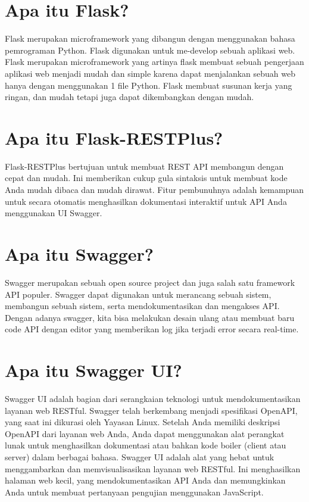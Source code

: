


\section{Apa itu Flask?}
Flask merupakan microframework yang dibangun dengan
menggunakan bahasa pemrograman Python. Flask digunakan
untuk me-develop sebuah aplikasi web. Flask merupakan
microframework yang artinya flask membuat sebuah pengerjaan
aplikasi web menjadi mudah dan simple karena dapat menjalankan
sebuah web hanya dengan menggunakan 1 file Python. Flask
membuat susunan kerja yang ringan, dan mudah tetapi juga dapat
dikembangkan dengan mudah\cite{gunawan2018aplikasi}.

\section{Apa itu Flask-RESTPlus?}
Flask-RESTPlus bertujuan untuk membuat REST API membangun dengan cepat dan mudah. Ini memberikan cukup gula sintaksis untuk membuat kode Anda mudah dibaca dan mudah dirawat. Fitur pembunuhnya adalah kemampuan untuk secara otomatis menghasilkan dokumentasi interaktif untuk API Anda menggunakan UI Swagger.

\section{Apa itu Swagger?}
Swagger merupakan sebuah open source project dan juga salah satu framework API populer. Swagger dapat digunakan untuk merancang sebuah sistem, membangun sebuah sistem, serta mendokumentasikan dan mengakses API. Dengan adanya swagger, kita bisa melakukan desain ulang atau membuat baru code API dengan editor yang memberikan log jika terjadi error secara real-time.

\section{Apa itu Swagger UI?}
Swagger UI adalah bagian dari serangkaian teknologi untuk mendokumentasikan layanan web RESTful. Swagger telah berkembang menjadi spesifikasi OpenAPI, yang saat ini dikurasi oleh Yayasan Linux. Setelah Anda memiliki deskripsi OpenAPI dari layanan web Anda, Anda dapat menggunakan alat perangkat lunak untuk menghasilkan dokumentasi atau bahkan kode boiler (client atau server) dalam berbagai bahasa.
Swagger UI adalah alat yang hebat untuk menggambarkan dan memvisualisasikan layanan web RESTful. Ini menghasilkan halaman web kecil, yang mendokumentasikan API Anda dan memungkinkan Anda untuk membuat pertanyaan pengujian menggunakan JavaScript.

